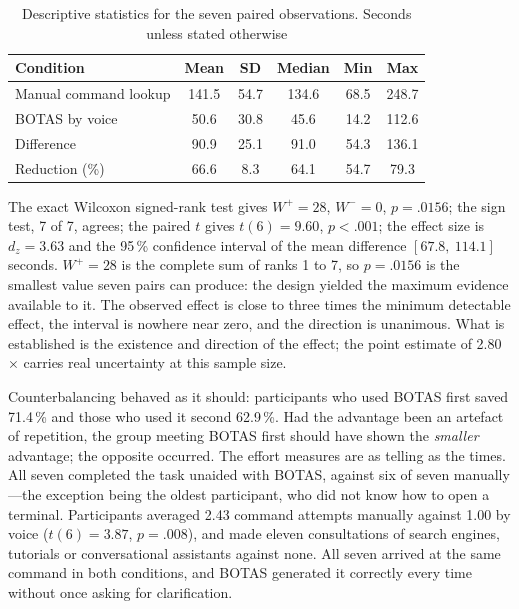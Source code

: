 \documentclass[10pt,a4paper]{article}
\begin{document}
\begin{table}[!ht]
    \centering
    \caption{Descriptive statistics for the seven paired observations. Seconds unless stated otherwise}
    \label{tab:c3}
    \fontsize{9}{10.8}\selectfont
    \begin{tabular}{lccccc}
        \toprule
        \textbf{Condition} & \textbf{Mean} & \textbf{SD} & \textbf{Median} & \textbf{Min} & \textbf{Max} \\
        \midrule
        Manual command lookup & 141.5 & 54.7 & 134.6 & 68.5 & 248.7 \\
        BOTAS by voice        &  50.6 & 30.8 &  45.6 & 14.2 & 112.6 \\
        Difference            &  90.9 & 25.1 &  91.0 & 54.3 & 136.1 \\
        Reduction (\%)        &  66.6 &  8.3 &  64.1 & 54.7 &  79.3 \\
        \bottomrule
    \end{tabular}
\end{table}

The exact Wilcoxon signed-rank test gives $W^{+} = 28$, $W^{-} = 0$, $p = .0156$; the sign test, 7 of 7, agrees; the paired $t$ gives $t(6) = 9.60$, $p < .001$; the effect size is $d_z = 3.63$ and the 95\,\% confidence interval of the mean difference $[67.8,\ 114.1]$ seconds. $W^{+} = 28$ is the complete sum of ranks 1 to 7, so $p = .0156$ is the smallest value seven pairs can produce: the design yielded the maximum evidence available to it. The observed effect is close to three times the minimum detectable effect, the interval is nowhere near zero, and the direction is unanimous. What is established is the existence and direction of the effect; the point estimate of 2.80$\times$ carries real uncertainty at this sample size.

Counterbalancing behaved as it should: participants who used BOTAS first saved 71.4\,\% and those who used it second 62.9\,\%. Had the advantage been an artefact of repetition, the group meeting BOTAS first should have shown the \emph{smaller} advantage; the opposite occurred. The effort measures are as telling as the times. All seven completed the task unaided with BOTAS, against six of seven manually---the exception being the oldest participant, who did not know how to open a terminal. Participants averaged 2.43 command attempts manually against 1.00 by voice ($t(6) = 3.87$, $p = .008$), and made eleven consultations of search engines, tutorials or conversational assistants against none. All seven arrived at the same command in both conditions, and BOTAS generated it correctly every time without once asking for clarification.
\end{document}
